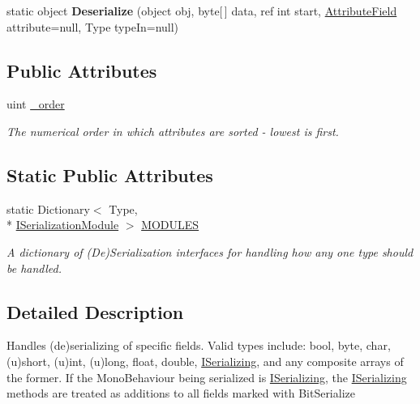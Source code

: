 \begin{DoxyCompactItemize}
\item 
\hypertarget{class_skyrates_1_1_util_1_1_serializing_1_1_bit_serialize_attribute_a6fbf51a07f2b2200bfd92a5cd6c33e7c}{static object {\bfseries Deserialize} (object obj, byte\mbox{[}$\,$\mbox{]} data, ref int start, \hyperlink{class_skyrates_1_1_util_1_1_serializing_1_1_bit_serialize_attribute_1_1_attribute_field}{Attribute\-Field} attribute=null, Type type\-In=null)}\label{class_skyrates_1_1_util_1_1_serializing_1_1_bit_serialize_attribute_a6fbf51a07f2b2200bfd92a5cd6c33e7c}

\end{DoxyCompactItemize}
\subsection*{Public Attributes}
\begin{DoxyCompactItemize}
\item 
uint \hyperlink{class_skyrates_1_1_util_1_1_serializing_1_1_bit_serialize_attribute_aa9a934a18a1edd047a3c789b74bb1ed7}{\-\_\-order}
\begin{DoxyCompactList}\small\item\em The numerical order in which attributes are sorted -\/ lowest is first. \end{DoxyCompactList}\end{DoxyCompactItemize}
\subsection*{Static Public Attributes}
\begin{DoxyCompactItemize}
\item 
static Dictionary$<$ Type, \\*
\hyperlink{interface_skyrates_1_1_util_1_1_serializing_1_1_bit_serialize_attribute_1_1_i_serialization_module}{I\-Serialization\-Module} $>$ \hyperlink{class_skyrates_1_1_util_1_1_serializing_1_1_bit_serialize_attribute_a089230f5e79f28cef11f6951b3b83053}{M\-O\-D\-U\-L\-E\-S}
\begin{DoxyCompactList}\small\item\em A dictionary of (De)Serialization interfaces for handling how any one type should be handled. \end{DoxyCompactList}\end{DoxyCompactItemize}


\subsection{Detailed Description}
Handles (de)serializing of specific fields. Valid types include\-: bool, byte, char, (u)short, (u)int, (u)long, float, double, \hyperlink{interface_skyrates_1_1_util_1_1_serializing_1_1_i_serializing}{I\-Serializing}, and any composite arrays of the former. If the Mono\-Behaviour being serialized is \hyperlink{interface_skyrates_1_1_util_1_1_serializing_1_1_i_serializing}{I\-Serializing}, the \hyperlink{interface_skyrates_1_1_util_1_1_serializing_1_1_i_serializing}{I\-Serializing} methods are treated as additions to all fields marked with Bit\-Serialize 



